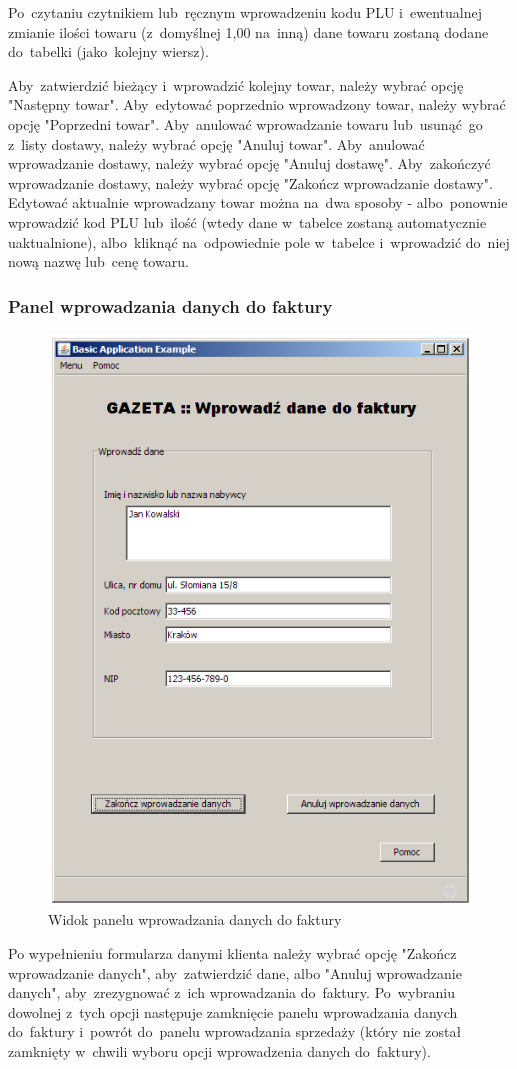 Po~czytaniu czytnikiem lub~ręcznym wprowadzeniu kodu PLU i~ewentualnej zmianie ilości towaru (z~domyślnej 1,00 na~inną) dane towaru zostaną dodane do~tabelki (jako~kolejny wiersz).

Aby~zatwierdzić bieżący i~wprowadzić kolejny towar, należy wybrać opcję "Następny towar". Aby~edytować poprzednio wprowadzony towar, należy wybrać opcję "Poprzedni towar". Aby~anulować wprowadzanie towaru lub~usunąć~go z~listy dostawy, należy wybrać opcję "Anuluj towar". Aby~anulować wprowadzanie dostawy, należy wybrać opcję "Anuluj dostawę". Aby~zakończyć wprowadzanie dostawy, należy wybrać opcję "Zakończ wprowadzanie dostawy".
Edytować aktualnie wprowadzany towar można na~dwa sposoby - albo~ponownie wprowadzić kod PLU lub~ilość (wtedy dane w~tabelce zostaną automatycznie uaktualnione), albo~kliknąć na~odpowiednie pole w~tabelce i~wprowadzić do~niej nową nazwę lub~cenę towaru.
\clearpage
\subsubsection{Panel wprowadzania danych do faktury}
\begin{figure}[h]
\includegraphics[width=1\textwidth]{gfx/dane_faktury.png}
\caption{Widok panelu wprowadzania danych do faktury}
\end{figure}
Po wypełnieniu formularza danymi klienta należy wybrać opcję "Zakończ wprowadzanie danych", aby~zatwierdzić dane, albo "Anuluj wprowadzanie danych", aby~zrezygnować z~ich wprowadzania do~faktury. Po~wybraniu dowolnej z~tych opcji następuje zamknięcie panelu wprowadzania danych do~faktury i~powrót do~panelu wprowadzania sprzedaży (który nie został zamknięty w~chwili wyboru opcji wprowadzenia danych do~faktury).
\clearpage
